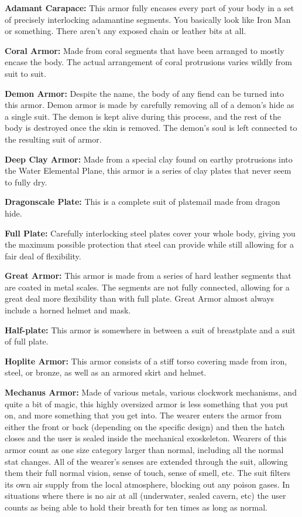 \textbf{Adamant Carapace:} This armor fully encases every part of your body in a set of precisely interlocking adamantine segments. You basically look like Iron Man or something. There aren't any exposed chain or leather bits at all.

\textbf{Coral Armor:} Made from coral segments that have been arranged to mostly encase the body. The actual arrangement of coral protrusions varies wildly from suit to suit.

\textbf{Demon Armor:} Despite the name, the body of any fiend can be turned into this armor. Demon armor is made by carefully removing all of a demon's hide as a single suit. The demon is kept alive during this process, and the rest of the body is destroyed once the skin is removed. The demon's soul is left connected to the resulting suit of armor.

\textbf{Deep Clay Armor:} Made from a special clay found on earthy protrusions into the Water Elemental Plane, this armor is a series of clay plates that never seem to fully dry.

\textbf{Dragonscale Plate:} This is a complete suit of platemail made from dragon hide.

\textbf{Full Plate:} Carefully interlocking steel plates cover your whole body, giving you the maximum possible protection that steel can provide while still allowing for a fair deal of flexibility.

\textbf{Great Armor:} This armor is made from a series of hard leather segments that are coated in metal scales. The segments are not fully connected, allowing for a great deal more flexibility than with full plate. Great Armor almost always include a horned helmet and mask.

\textbf{Half-plate:} This armor is somewhere in between a suit of breastplate and a suit of full plate.

\textbf{Hoplite Armor:} This armor consists of a stiff torso covering made from iron, steel, or bronze, as well as an armored skirt  and helmet.

\textbf{Mechanus Armor:} Made of various metals, various clockwork mechanisms, and quite a bit of magic, this highly oversized armor is less something that you put on, and more something that you get into. The wearer enters the armor from either the front or back (depending on the specific design) and then the hatch closes and the user is sealed inside the mechanical exoskeleton. Wearers of this armor count as one size category larger than normal, including all the normal stat changes. All of the wearer's senses are extended through the suit, allowing them their full normal vision, sense of touch, sense of smell, etc. The suit filters its own air supply from the local atmosphere, blocking out any poison gases. In situations where there is no air at all (underwater, sealed cavern, etc) the user counts as being able to hold their breath for ten times as long as normal.

